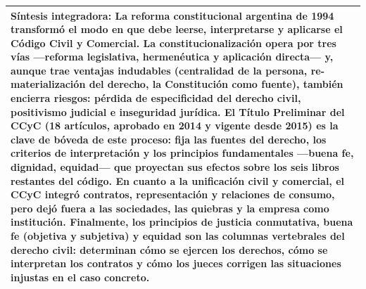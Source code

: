 \documentclass[12pt,oneside]{book}
\begin{document}
\begin{longtable}{|p{}|p{}|}
\multicolumn{2}{|p{0.90\textwidth}|}{
\vspace{0.2em}
\textbf{Síntesis integradora:} La reforma constitucional argentina de 1994 transformó el modo en que debe leerse, interpretarse y aplicarse el Código Civil y Comercial. La constitucionalización opera por tres vías —reforma legislativa, hermenéutica y aplicación directa— y, aunque trae ventajas indudables (centralidad de la persona, re-materialización del derecho, la Constitución como fuente), también encierra riesgos: pérdida de especificidad del derecho civil, positivismo judicial e inseguridad jurídica. El Título Preliminar del CCyC (18 artículos, aprobado en 2014 y vigente desde 2015) es la clave de bóveda de este proceso: fija las fuentes del derecho, los criterios de interpretación y los principios fundamentales —buena fe, dignidad, equidad— que proyectan sus efectos sobre los seis libros restantes del código. En cuanto a la unificación civil y comercial, el CCyC integró contratos, representación y relaciones de consumo, pero dejó fuera a las sociedades, las quiebras y la empresa como institución. Finalmente, los principios de justicia conmutativa, buena fe (objetiva y subjetiva) y equidad son las columnas vertebrales del derecho civil: determinan cómo se ejercen los derechos, cómo se interpretan los contratos y cómo los jueces corrigen las situaciones injustas en el caso concreto.
\vspace{0.3em}
} \\
\hline

\end{longtable}
\end{document}
